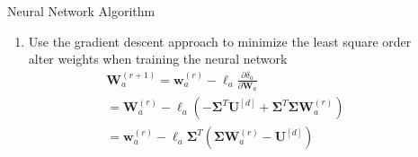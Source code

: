 \documentclass[final]{beamer}
\newlength{\sepwid}
\newlength{\onecolwid}
\begin{document}
\begin{frame}[t]
\begin{columns}[t]
\begin{column}{\onecolwid}
\begin{alertblock}{Neural Network Algorithm}
\begin{enumerate}
\begin{align*}
	\end{align*}
	\begin{align*}
  		{\bf W}_a = \left(\bm{\Sigma}^T\bm{\Sigma}\right)^T\bm{\Sigma}^T{\bf U}^{[d]}.
	\end{align*}
	\item Use the gradient descent approach to minimize the least square order alter weights when training the neural network
	\begin{multline*}
  		\mathbf{W}_a^{(r+1)} = \mathbf{w}_a^{(r)} - \ell_a\frac{\partial\delta_a}{\partial\mathbf{W}_a}\\
  		=\mathbf{W}_a^{(r)} - \ell_a\left(-\bm{\Sigma}^T\mathbf{U}^{[d]} + \bm{\Sigma}^T \bm{\Sigma}\mathbf{W}				_a^{(r)}\right)\\
  		= \mathbf{w}_a^{(r)}-\ell_a \bm{\Sigma}^T\left(\bm{\Sigma}\mathbf{W}_a^{(r)} - \mathbf{U}^{[d]}\right)
	\end{multline*}
\end{enumerate}

\vskip -2.5cm
\end{alertblock}



\end{column} %

\begin{column}{\sepwid}\end{column}

\begin{column}{\onecolwid} %



\end{column}
\end{columns}
\end{frame}
\end{document}
